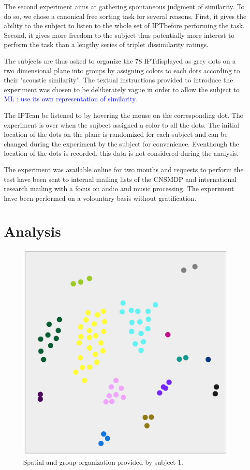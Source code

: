 \documentclass{article}
\newcommand{\ipt}{IPT}
\newcommand{\ml}[1]{\textcolor{blue}{ML : #1}}
\begin{document}
The second experiment aims at gathering spontaneous judgment of similarity. To do so, we chose a canonical free sorting task  for several reasons. First, it gives the ability to the subject to listen to the whole set of \ipt before performing the task. Second, it gives more freedom to the subject thus potentially more interest to perform the task than a lengthy series of triplet dissimilarity ratings.

The subjects are thus asked to organize the 78 \ipt displayed as grey dots on a two dimensional plane into groups by assigning colors to each dots according to their "acoustic similarity". The textual instructions provided to introduce the experiment was chosen to be deliberately vague in order to allow the subject to \ml{use its own representation of similarity}.

The \ipt can be listened to by hovering the mouse on the corresponding dot. The experiment is over when the sujbect assigned a color to all the dots. The initial location of the dots on the plane is randomized for each subject and can be changed during the experiment by the subject for convenience. Eventhough the location of the dots is recorded, this data is not considered during the analysis.

The experiment was available online for two months and requests to perform the test have been sent to internal mailing lists of the CNSMDP and international research mailing with a focus on audio and music processing. The experiment have been performed on a volountary basis without gratification.

\section{Analysis}\label{sec:analysis}

\begin{figure}
\center
\includegraphics[width = \textwidth]{figures/xp2example.png}
\caption{Spatial and group organization provided by subject 1.}
\label{fig:xp2display}
\end{figure}
\end{document}
